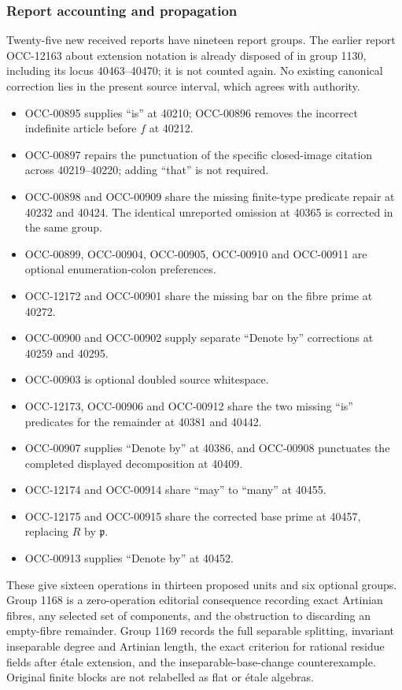 \subsubsection{Report accounting and propagation}\label{report-accounting-and-propagation}

Twenty-five new received reports have nineteen report groups. The earlier report OCC-12163 about extension notation is already disposed of in group 1130, including its locus 40463--40470; it is not counted again. No existing canonical correction lies in the present source interval, which agrees with authority.

\begin{itemize}
\tightlist
\item
  OCC-00895 supplies ``is'' at 40210; OCC-00896 removes the incorrect indefinite article before \(f\) at 40212.
\item
  OCC-00897 repairs the punctuation of the specific closed-image citation across 40219--40220; adding ``that'' is not required.
\item
  OCC-00898 and OCC-00909 share the missing finite-type predicate repair at 40232 and 40424. The identical unreported omission at 40365 is corrected in the same group.
\item
  OCC-00899, OCC-00904, OCC-00905, OCC-00910 and OCC-00911 are optional enumeration-colon preferences.
\item
  OCC-12172 and OCC-00901 share the missing bar on the fibre prime at 40272.
\item
  OCC-00900 and OCC-00902 supply separate ``Denote by'' corrections at 40259 and 40295.
\item
  OCC-00903 is optional doubled source whitespace.
\item
  OCC-12173, OCC-00906 and OCC-00912 share the two missing ``is'' predicates for the remainder at 40381 and 40442.
\item
  OCC-00907 supplies ``Denote by'' at 40386, and OCC-00908 punctuates the completed displayed decomposition at 40409.
\item
  OCC-12174 and OCC-00914 share ``may'' to ``many'' at 40455.
\item
  OCC-12175 and OCC-00915 share the corrected base prime at 40457, replacing \(R\) by \(\mathfrak p\).
\item
  OCC-00913 supplies ``Denote by'' at 40452.
\end{itemize}

These give sixteen operations in thirteen proposed units and six optional groups. Group 1168 is a zero-operation editorial consequence recording exact Artinian fibres, any selected set of components, and the obstruction to discarding an empty-fibre remainder. Group 1169 records the full separable splitting, invariant inseparable degree and Artinian length, the exact criterion for rational residue fields after étale extension, and the inseparable-base-change counterexample. Original finite blocks are not relabelled as flat or étale algebras.

